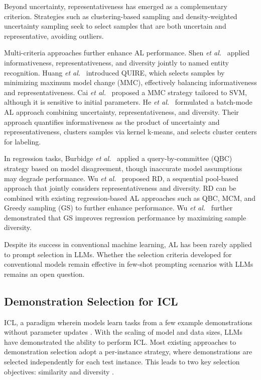 \documentclass[journal,twocolumn]{IEEEtran}
\begin{document}
Beyond uncertainty, representativeness has emerged as a complementary criterion. Strategies such as clustering-based sampling \cite{nguyen2004active} and density-weighted uncertainty sampling \cite{settles2008analysis} seek to select samples that are both uncertain and representative, avoiding outliers.

Multi-criteria approaches further enhance AL performance. Shen \textit{et al.}~\cite{Shen2004a} applied informativeness, representativeness, and diversity jointly to named entity recognition. Huang \textit{et al.}~\cite{huang2010active} introduced QUIRE, which selects samples by minimizing maximum model change (MMC), effectively balancing informativeness and representativeness. Cai \textit{et al.}~\cite{Cai2014} proposed a MMC strategy tailored to SVM, although it is sensitive to initial parameters. He \textit{et al.}~\cite{He2014} formulated a batch-mode AL approach combining uncertainty, representativeness, and diversity. Their approach quantifies informativeness as the product of uncertainty and representativeness, clusters samples via kernel k-means, and selects cluster centers for labeling.

In regression tasks, Burbidge \textit{et al.}~\cite{Burbidge2017} applied a query-by-committee (QBC) strategy based on model disagreement, though inaccurate model assumptions may degrade performance. Wu \textit{et al.}~\cite{wu2018pool}  proposed RD, a sequential pool-based approach that jointly considers representativeness and diversity. RD can be combined with existing regression-based AL approaches such as QBC, MCM, and Greedy sampling (GS) to further enhance performance. Wu \textit{et al.}~\cite{drwuiGS2019} further demonstrated that GS improves regression performance by maximizing sample diversity.

Despite its success in conventional machine learning, AL has been rarely applied to prompt selection in LLMs. Whether the selection criteria developed for conventional models remain effective in few-shot prompting scenarios with LLMs remains an open question.

\subsection{Demonstration Selection for ICL}
ICL, a paradigm wherein models learn tasks from a few example demonstrations without parameter updates \cite{dong-etal-2024-survey, achiam2023gpt}. With the scaling of model and data sizes, LLMs have demonstrated the ability to perform ICL. Most existing approaches to demonstration selection adopt a per-instance strategy, where demonstrations are selected independently for each test instance. This leads to two key selection objectives: similarity and diversity \cite{luo2024context}.
\end{document}

